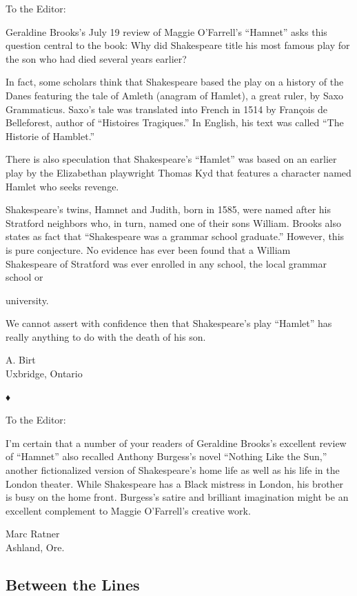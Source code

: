 To the Editor:

Geraldine Brooks's July 19 review of Maggie O'Farrell's ``Hamnet'' asks
this question central to the book: Why did Shakespeare title his most
famous play for the son who had died several years earlier?

In fact, some scholars think that Shakespeare based the play on a
history of the Danes featuring the tale of Amleth (anagram of Hamlet), a
great ruler, by Saxo Grammaticus. Saxo's tale was translated into French
in 1514 by François de Belleforest, author of ``Histoires Tragiques.''
In English, his text was called ``The Historie of Hamblet.''

There is also speculation that Shakespeare's ``Hamlet'' was based on an
earlier play by the Elizabethan playwright Thomas Kyd that features a
character named Hamlet who seeks revenge.

Shakespeare's twins, Hamnet and Judith, born in 1585, were named after
his Stratford neighbors who, in turn, named one of their sons William.
Brooks also states as fact that ``Shakespeare was a grammar school
graduate.'' However, this is pure conjecture. No evidence has ever been
found that a William\\
Shakespeare of Stratford was ever enrolled in any school, the local
grammar school or

university.

We cannot assert with confidence then that Shakespeare's play ``Hamlet''
has really anything to do with the death of his son.

A. Birt\\
Uxbridge, Ontario

♦

To the Editor:

I'm certain that a number of your readers of Geraldine Brooks's
excellent review of ``Hamnet'' also recalled Anthony Burgess's novel
``Nothing Like the Sun,'' another fictionalized version of Shakespeare's
home life as well as his life in the London theater. While Shakespeare
has a Black mistress in London, his brother is busy on the home front.
Burgess's satire and brilliant imagination might be an excellent
complement to Maggie O'Farrell's creative work.

Marc Ratner\\
Ashland, Ore.

\hypertarget{between-the-lines}{%
\subsection{Between the Lines}\label{between-the-lines}}

